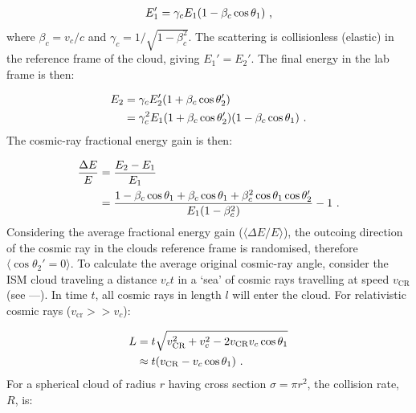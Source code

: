 \begin{equation}
    \begin{aligned}
        E_1'=\gamma_cE_1\qty(1-\beta_c\cos\theta_1)\text{ ,}
    \end{aligned}
\end{equation}
\noindent where $\beta_c=v_c/c$ and $\gamma_c=1/\sqrt{1-\beta_c^2}$. The scattering is collisionless (elastic) in the reference frame of the cloud, giving $E_1'=E_2'$. The final energy in the lab frame is then:

\begin{equation}
    \begin{aligned}
        E_2&=\gamma_c E_2'\qty(1+\beta_c\cos\theta_2') \\
        &=\gamma_c^2E_1\qty(1+\beta_c\cos\theta_2')\qty(1-\beta_c\cos\theta_1) \text{ .}
    \end{aligned}
\end{equation}
\noindent The cosmic-ray fractional energy gain is then:

\begin{equation}
    \begin{aligned}
        \frac{\Delta E}{E}&=\frac{E_2-E_1}{E_1} \\
        &=\frac{1-\beta_c\cos\theta_1+\beta_c\cos\theta_1+\beta_c^2\cos\theta_1\cos\theta_2'}{E_1\qty(1-\beta_c^2)}-1\text{ .}
    \end{aligned}
\end{equation}
\noindent Considering the average fractional energy gain ($\langle \Delta E/E \rangle$), the outcoing direction of the cosmic ray in the clouds reference frame is randomised, therefore $\langle \cos\theta_2'=0 \rangle$. To calculate the average original cosmic-ray angle, consider the ISM cloud traveling a distance $v_ct$ in a `sea' of cosmic rays travelling at speed $v_\text{CR}$ (see ---). In time $t$, all cosmic rays in length $l$ will enter the cloud. For relativistic cosmic rays ($v_\text{cr}>>v_c$):

\begin{equation}
    \begin{aligned}
        L&=t\sqrt{v_\text{CR}^2+v_c^2-2v_\text{CR}v_c\cos\theta_1} \\
        &\approx t\qty(v_\text{CR}-v_c\cos\theta_1) \text{ .}
    \end{aligned}
\end{equation}
\noindent For a spherical cloud of radius $r$ having cross section $\sigma=\pi r^2$, the collision rate, $R$, is:

